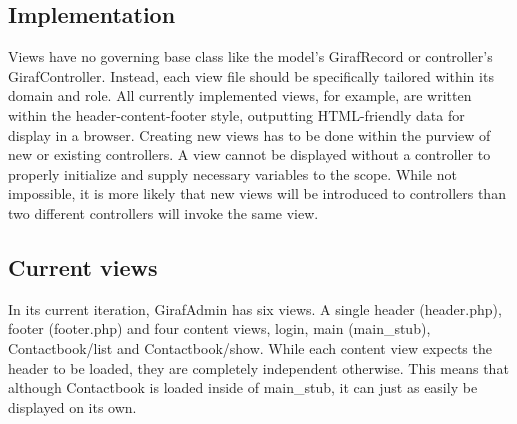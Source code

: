 \subsection{Implementation}
Views have no governing base class like the model's GirafRecord or controller's GirafController. Instead, each view file should be specifically tailored within its domain and role. All currently implemented views, for example, are written within the header-content-footer style, outputting HTML-friendly data for display in a browser.
Creating new views has to be done within the purview of new or existing controllers. A view cannot be displayed without a controller to properly initialize and supply necessary variables to the scope. While not impossible, it is more likely that new views will be introduced to controllers than two different controllers will invoke the same view.

\subsection{Current views}
In its current iteration, GirafAdmin has six views. A single header (header.php), footer (footer.php) and four content views, login, main (main\_stub), Contactbook/list and Contactbook/show. While each content view expects the header to be loaded, they are completely independent otherwise. This means that although Contactbook is loaded inside of main\_stub, it can just as easily be displayed on its own.